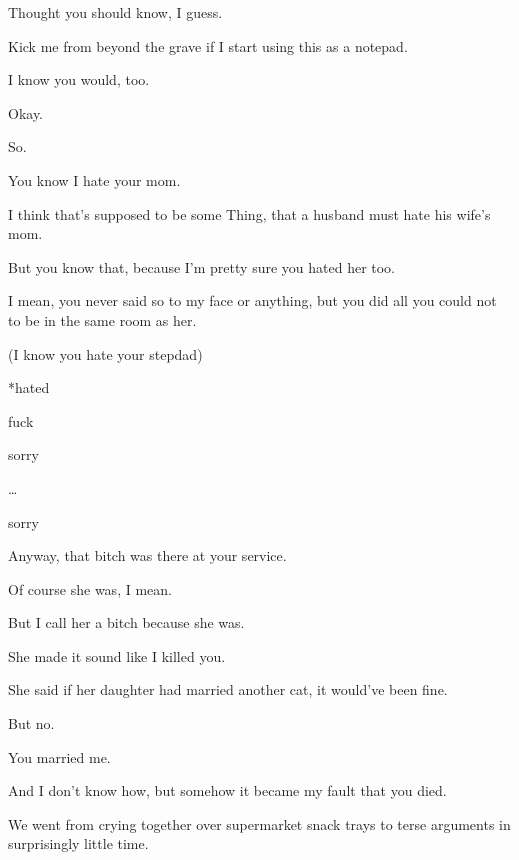 { Thought you should know, I guess.

 Kick me from beyond the grave if I start using this as a notepad.

 I know you would, too.

\nopagebreak

 Okay.

 So.

 You know I hate your mom.

 I think that's supposed to be some Thing, that a husband must hate his wife's mom.

 But you know that, because I'm pretty sure you hated her too.

 I mean, you never said so to my face or anything, but you did all you could not to be in the same room as her.

(I know you hate your stepdad)

*hated

 fuck

 sorry

\ldots{}

 sorry

\nopagebreak

 Anyway, that bitch was there at your service.

 Of course she was, I mean.

 But I call her a bitch because she was.

 She made it sound like I killed you.

 She said if her daughter had married another cat, it would've been fine.

 But no.

 You married me.

 And I don't know how, but somehow it became my fault that you died.

 We went from crying together over supermarket snack trays to terse arguments in surprisingly little time.

}

